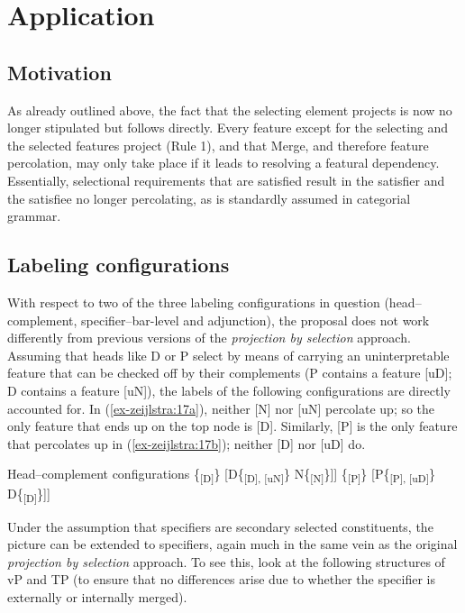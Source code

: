 \documentclass[output=paper
,modfonts
,nonflat]{langsci/langscibook}
\begin{document}
\section{Application}
\subsection{Motivation}
As already outlined above, the fact that the selecting element projects is now no longer stipulated but follows directly. Every feature except for the selecting and the selected features project (Rule 1), and that Merge, and therefore feature percolation, may only take place if it leads to resolving a featural dependency. Essentially, selectional requirements that are satisfied result in the satisfier and the satisfiee no longer percolating, as is standardly assumed in categorial grammar. 

\subsection{Labeling configurations} \label{sec-zeijlstra:3.2}
With respect to two of the three labeling configurations in question (head--complement, specifier--bar-level and adjunction), the proposal does not work differently from previous versions of the \textit{projection by selection} approach. Assuming that heads like D or P select by means of carrying an uninterpretable feature that can be checked off by their complements (P contains a feature [uD]; D contains a feature [uN]), the labels of the following configurations are directly accounted for. In (\ref{ex-zeijlstra:17a}), neither [N] nor [uN] percolate up; so the only feature that ends up on the top node is [D]. Similarly, [P] is the only feature that percolates up in (\ref{ex-zeijlstra:17b}); neither [D] nor [uD] do.

\begin{exe}
	\ex Head–complement configurations \label{ex-zeijlstra:17}
	\xlist
	\ex {[}\{\textsubscript{{[}D{]}}\} \label{ex-zeijlstra:17a} {[}D\{\textsubscript{{[}D{]}, {[}uN{]}}\} N\{\textsubscript{{[}N{]}}\}{]}{]}
	\ex {[}\{\textsubscript{{[}P{]}}\} \label{ex-zeijlstra:17b} {[}P\{\textsubscript{{[}P{]}, {[}uD{]}}\} D\{\textsubscript{{[}D{]}}\}{]}{]}
	\endxlist
\end{exe}
Under the assumption that specifiers are secondary selected constituents, the picture can be extended to specifiers, again much in the same vein as the original \textit{projection by selection} approach. To see this, look at the following structures of vP and TP (to ensure that no differences arise due to whether the specifier is externally or internally merged).
\end{document}
